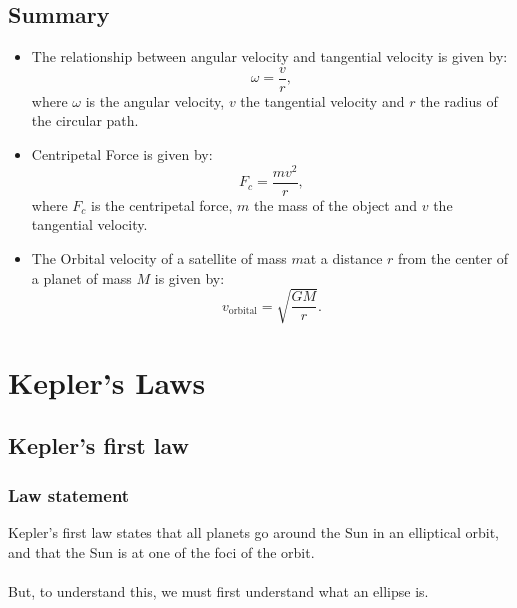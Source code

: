 \documentclass[a4paper]{report}
\begin{document}
\section{Summary}
\begin{itemize}
  \item The relationship between angular velocity and tangential velocity is given by: 
    $$\omega=\frac{v}{r},$$ where $\omega$ is the angular velocity, $v$ the tangential velocity and $r$ the
    radius of the circular path.
  \item Centripetal Force is given by: $$F_c=\frac{mv^2}{r},$$ where $F_c$ is the centripetal force, 
    $m$ the mass of the object and $v$ the tangential velocity.
  \item The Orbital velocity of a satellite of mass $m$at a distance $r$ from the center of a planet of mass
    $M$ is given by: $$v_{\text{orbital}}=\sqrt{\frac{GM}{r}}.$$
\end{itemize}



\chapter{Kepler's Laws}
\section{Kepler's first law}
\subsection{Law statement}
Kepler's first law states that all planets go around the Sun in an elliptical orbit, and that the Sun is 
at one of the foci of the orbit.\\\\
But, to understand this, we must first understand what an ellipse is.
\end{document}
